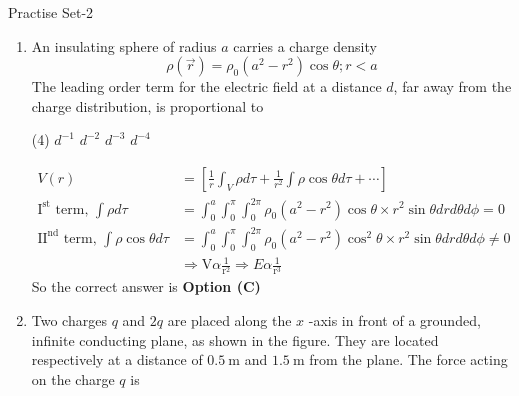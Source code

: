 \begin{abox}
	Practise Set-2
\end{abox}
\begin{enumerate}
\item An insulating sphere of radius $a$ carries a charge density
$$
\rho(\vec{r})=\rho_{0}\left(a^{2}-r^{2}\right) \cos \theta ; r<a
$$
The leading order term for the electric field at a distance $d$, far away from the charge distribution, is proportional to

\begin{tasks}(4)
\task[\textbf{A.}] $d^{-1}$
\task[\textbf{B.}] $d^{-2}$
\task[\textbf{C.}] $d^{-3}$
\task[\textbf{D.}] $d^{-4}$
\end{tasks}	
\begin{answer}
	\begin{align*}
	V(r)&=\left[\frac{1}{r} \int_{V} \rho d \tau+\frac{1}{r^{2}} \int \rho \cos \theta d \tau+\cdots\right]\\
	\mathrm{I}^{\mathrm{st}}\text{ term, }\int \rho d \tau&=\int_{0}^{a} \int_{0}^{\pi} \int_{0}^{2 \pi} \rho_{0}\left(a^{2}-r^{2}\right) \cos \theta \times r^{2} \sin \theta d r d \theta d \phi=0\\
	\mathrm{II}^{\mathrm{nd}}\text{ term, }\int \rho \cos \theta d \tau&=\int_{0}^{a} \int_{0}^{\pi} \int_{0}^{2 \pi} \rho_{0}\left(a^{2}-r^{2}\right) \cos ^{2} \theta \times r^{2} \sin \theta d r d \theta d \phi \neq 0\\
	&\Rightarrow \mathrm{V} \alpha \frac{1}{\mathrm{r}^{2}} \Rightarrow E \alpha \frac{1}{\mathrm{r}^{3}}
	\end{align*}
	So the correct answer is \textbf{Option (C)}
\end{answer}
\item Two charges $q$ and $2 q$ are placed along the $x$ -axis in front of a grounded, infinite conducting plane, as shown in the figure. They are located respectively at a distance of $0.5 \mathrm{~m}$ and $1.5 \mathrm{~m}$ from the plane. The force acting on the charge $q$ is


\end{enumerate}
